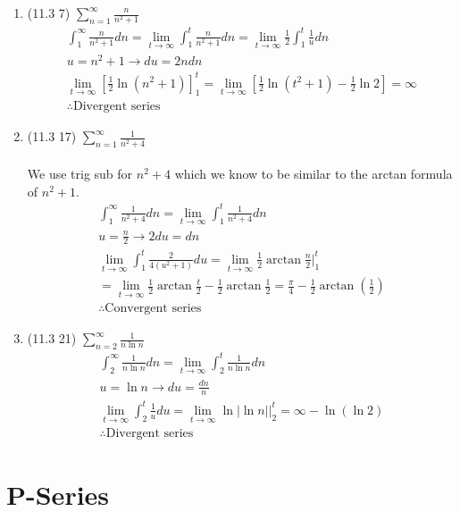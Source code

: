 \documentclass[12pt]{article}
\begin{document}
\begin{enumerate}
\begin{enumerate}
        \item (11.3 7) $\sum_{n=1}^\infty\frac{n}{n^2+1}$
        \begin{gather*}
              \int_1^\infty\frac{n}{n^2+1}dn=\lim_{t\to\infty}\int_1^t\frac{n}{n^2+1}dn=\lim_{t\to\infty}\frac{1}{2}\int_1^t\frac{1}{u}dn\\
            u=n^2+1 \to du=2ndn\\
            \lim_{t\to\infty}\left[\frac{1}{2}\ln{(n^2+1)}\right]_1^t=\lim_{t\to\infty}\left[\frac{1}{2}\ln(t^2+1)-\frac{1}{2}\ln{2}\right]=\infty
            \\\therefore \text{Divergent series}
        \end{gather*}
        \newpage\item (11.3 17) $\sum_{n=1}^\infty\frac{1}{n^2+4}$
        \\\\We use trig sub for $n^2+4$ which we know to be similar to the arctan formula of $n^2+1$. 
        \begin{gather*}
            \int_1^\infty\frac{1}{n^2+4}dn=\lim_{t\to\infty}\int_1^t\frac{1}{n^2+4}dn
            \\u = \frac{n}{2} \to 2du=dn\\
            \lim_{t\to\infty}\int_1^t\frac{2}{4(u^2+1)}du=
            \lim_{t\to\infty}\frac{1}{2}\arctan{\frac{n}{2}\bigg|_1^t}
            \\=\lim_{t\to\infty}\frac{1}{2}\arctan{\frac{t}{2}}-\frac{1}{2}\arctan{\frac{1}{2}}=\frac{\pi}{4}-\frac{1}{2}\arctan\left(\frac{1}{2}\right)
            \\ \therefore \text{Convergent series}
        \end{gather*}
        \item (11.3 21) $\sum_{n=2}^\infty\frac{1}{n\ln{n}}$
        \begin{gather*}
            \int_2^\infty\frac{1}{n\ln{n}}dn=\lim_{t\to\infty}\int_2^t\frac{1}{n\ln{n}}dn
            \\ u = \ln{n} \to du = \frac{dn}{n}
            \\ \lim_{t\to\infty}\int_2^t\frac{1}{u}du=\lim_{t\to\infty}\ln|\ln n|\bigg|_2^t=\infty-\ln{(\ln2)}
            \\\therefore \text{Divergent series}        \end{gather*}
    \end{enumerate}
\end{enumerate}
\newpage\section{P-Series}
\end{document}
